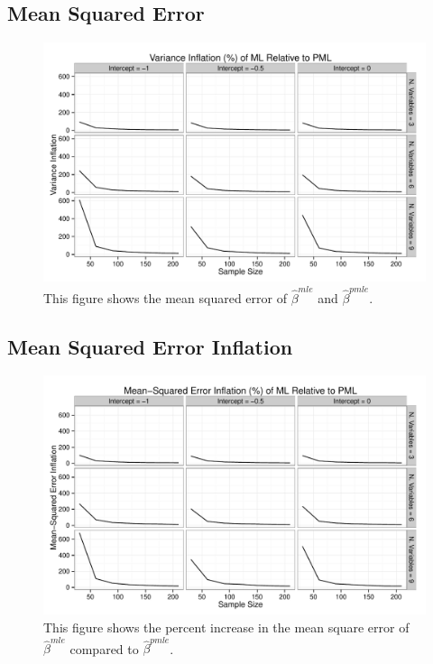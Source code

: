 \documentclass[12pt]{article}
\begin{document}
\begin{appendix}
\subsection{Mean Squared Error}

\begin{figure}[H]
\begin{center}
\includegraphics[width = \textwidth]{figs/sims-var-infl.pdf}
\caption{This figure shows the mean squared error of $\hat{\beta}^{mle}$ and $\hat{\beta}^{pmle}$.}\label{fig:mse}
\end{center}
\end{figure}

\subsection{Mean Squared Error Inflation}

\begin{figure}[H]
\begin{center}
\includegraphics[width = \textwidth]{figs/sims-mse-infl.pdf}
\caption{This figure shows the percent increase in the mean square error of $\hat{\beta}^{mle}$ compared to $\hat{\beta}^{pmle}$.}\label{fig:mse-infl}
\end{center}
\end{figure}


\end{appendix}
\end{document}

